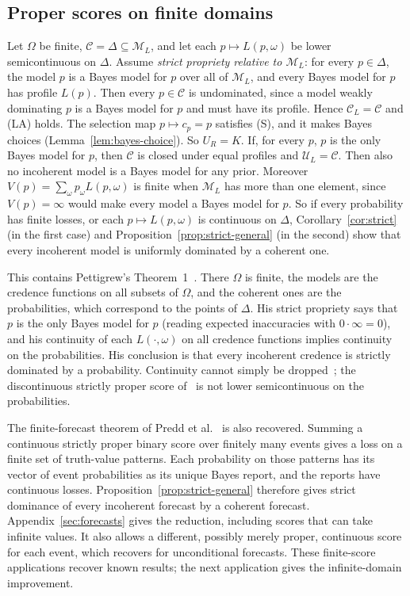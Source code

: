 \documentclass[11pt]{article}
\theoremstyle{definition}
\theoremstyle{remark}
\newcommand{\M}{\mathcal M}
\newcommand{\C}{\mathcal C}
\newcommand{\U}{\mathcal U}
\begin{document}
\subsection{Proper scores on finite domains}\label{sec:proper}
Let $\Omega$ be finite, $\C=\Delta\subseteq\M_L$, and let each $p\mapsto L(p,\omega)$ be lower semicontinuous on $\Delta$. Assume \emph{strict propriety relative to $\M_L$}: for every $p\in\Delta$, the model $p$ is a Bayes model for $p$ over all of $\M_L$, and every Bayes model for $p$ has profile $L(p)$. Then every $p\in\C$ is undominated, since a model weakly dominating $p$ is a Bayes model for $p$ and must have its profile. Hence $\C_L=\C$ and (LA) holds. The selection map $p\mapsto c_p=p$ satisfies (S), and it makes Bayes choices (Lemma~\ref{lem:bayes-choice}). So $U_R=K$. If, for every $p$, $p$ is the only Bayes model for $p$, then $\C$ is closed under equal profiles and $\U_L=\C$. Then also no incoherent model is a Bayes model for any prior. Moreover $V(p)=\sum_\omega p_\omega L(p,\omega)$ is finite when $\M_L$ has more than one element, since $V(p)=\infty$ would make every model a Bayes model for $p$. So if every probability has finite losses, or each $p\mapsto L(p,\omega)$ is continuous on $\Delta$, Corollary~\ref{cor:strict} (in the first case) and Proposition~\ref{prop:strict-general} (in the second) show that every incoherent model is uniformly dominated by a coherent one.

This contains Pettigrew's Theorem~1~\cite{Pettigrew}. There $\Omega$ is finite, the models are the credence functions on all subsets of $\Omega$, and the coherent ones are the probabilities, which correspond to the points of $\Delta$. His strict propriety says that $p$ is the only Bayes model for $p$ (reading expected inaccuracies with $0\cdot\infty=0$), and his continuity of each $L(\cdot,\omega)$ on all credence functions implies continuity on the probabilities. His conclusion is that every incoherent credence is strictly dominated by a probability. Continuity cannot simply be dropped~\cite{SSK09}; the discontinuous strictly proper score of~\cite[Example~4]{SSK09} is not lower semicontinuous on the probabilities.

The finite-forecast theorem of Predd et al.~\cite[Theorem~1]{Predd} is also recovered. Summing a continuous strictly proper binary score over finitely many events gives a loss on a finite set of truth-value patterns. Each probability on those patterns has its vector of event probabilities as its unique Bayes report, and the reports have continuous losses. Proposition~\ref{prop:strict-general} therefore gives strict dominance of every incoherent forecast by a coherent forecast. Appendix~\ref{sec:forecasts} gives the reduction, including scores that can take infinite values. It also allows a different, possibly merely proper, continuous score for each event, which recovers \cite[Theorem~2, Conclusion~3]{SSK09} for unconditional forecasts. These finite-score applications recover known results; the next application gives the infinite-domain improvement.
\end{document}
